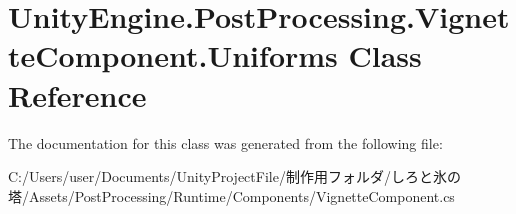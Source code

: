 \hypertarget{class_unity_engine_1_1_post_processing_1_1_vignette_component_1_1_uniforms}{}\section{Unity\+Engine.\+Post\+Processing.\+Vignette\+Component.\+Uniforms Class Reference}
\label{class_unity_engine_1_1_post_processing_1_1_vignette_component_1_1_uniforms}


The documentation for this class was generated from the following file\+:\begin{DoxyCompactItemize}
\item 
C\+:/\+Users/user/\+Documents/\+Unity\+Project\+File/制作用フォルダ/しろと氷の塔/\+Assets/\+Post\+Processing/\+Runtime/\+Components/Vignette\+Component.\+cs\end{DoxyCompactItemize}
